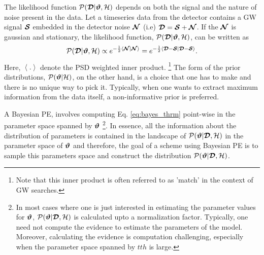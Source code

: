 The likelihood function $\mathcal{P}(\boldsymbol{\mathcal{D}}|\boldsymbol{\vartheta},\mathcal{H})$ depends on both the signal and the nature of noise present in the data. Let a timeseries data from the detector contains a GW signal $\boldsymbol{\mathcal{S}}$ embedded in the detector noise $\boldsymbol{\mathcal{N}}$ (i.e) $\boldsymbol{\mathcal{D}}= \boldsymbol{\mathcal{S}}+\boldsymbol{\mathcal{N}}$. If the $\boldsymbol{\mathcal{N}}$ is gaussian and stationary, the likelihood function, $\mathcal{P}(\boldsymbol{\mathcal{D}}|\boldsymbol{\vartheta},\mathcal{H})$, can be written as 
\begin{align}
\mathcal{P}(\boldsymbol{\mathcal{D}}|\boldsymbol{\vartheta},\mathcal{H}) \propto e^{-\frac{1}{2} \left\langle \boldsymbol{\mathcal{N}}|\boldsymbol{\mathcal{N}}  \right\rangle}= e^{-\frac{1}{2} \left\langle \boldsymbol{\mathcal{D}} - \boldsymbol{\mathcal{S}}|\boldsymbol{\mathcal{D}} - \boldsymbol{\mathcal{S}}  \right\rangle}.
\end{align}
Here, $\left\langle . \right\rangle$ denote the PSD weighted inner product. \footnote{Note that this inner product is often referred to as 'match' in the context of GW searches.} The form of the prior distributions, $\mathcal{P}(\boldsymbol{\vartheta}|\mathcal{H})$, on the other hand, is a choice that one has to make and there is no unique way to pick it. Typically, when one wants to extract maximum information from the data itself, a non-informative prior is preferred. 

A Bayesian PE, involves computing Eq. \ref{eq:bayes_thrm} point-wise in the parameter space spanned by $\boldsymbol{\vartheta}$ \footnote{In most cases where one is just interested in estimating the parameter values for $\boldsymbol{\vartheta}$, $\mathcal{P}(\boldsymbol{\vartheta}|\boldsymbol{\mathcal{D}},\mathcal{H})$ is calculated upto a normalization factor. Typically, one need not compute the evidence to estimate the parameters of the model. Moreover, calculating the evidence is computation challenging, especially when the parameter space spanned by $tth$ is large. }. In essence, all the information about the distribution of parameters is contained in the landscape of $\mathcal{P}(\boldsymbol{\vartheta}|\boldsymbol{\mathcal{D}},\mathcal{H})$ in the parameter space of $\boldsymbol{\vartheta}$ and therefore, the goal of a scheme using Bayesian PE is to sample this parameters space and construct the distribution $\mathcal{P}(\boldsymbol{\vartheta}|\boldsymbol{\mathcal{D}},\mathcal{H})$. 







